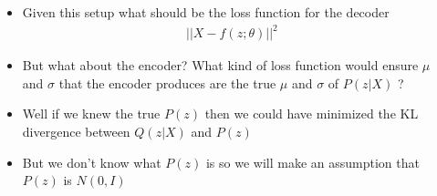 \documentclass[serif,aspectratio=169,dvipsnames]{beamer}
\begin{document}
\begin{frame}
\begin{columns}
\begin{overlayarea}{\textwidth}{\textheight}
		\end{overlayarea}
		\begin{overlayarea}{\textwidth}{\textheight}
			\begin{itemize}\justifying
				\item<1-> Given this setup what should be the loss function for the decoder
				\begin{align*}
					||X - f(z; \theta)||^2
				\end{align*}
				\item<2-> But what about the encoder? What kind of loss function would ensure $\mu$ and $\sigma$ that the encoder produces are the true $\mu$ and $\sigma$ of $P(z|X)$ ?
				\item<3-> Well if we knew the true $P(z)$ then we could have minimized the KL divergence between $Q(z|X)$ and $P(z)$
				\item<4-> But we don't know what $P(z)$ is so we will make an assumption that $P(z)$ is $N(0, I)$
			\end{itemize}
		\end{overlayarea}
	\end{columns}
\end{frame}
\end{document}
